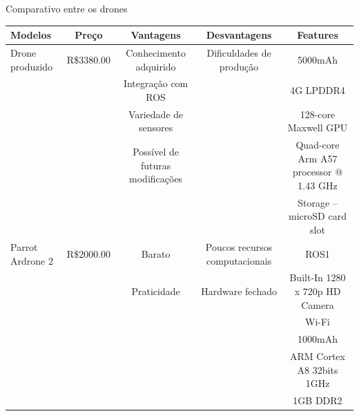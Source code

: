 \begin{frame}[t]{Comparativo entre os drones}
  \transdissolve[duration=0.5]

  \centering
  \resizebox{\textwidth}{!} {
    \begin{tabular}{ l c c c c}
      \textbf{Modelos} & \textbf{Preço} & \textbf{Vantagens}               & \textbf{Desvantagens}          & \textbf{Features}                      \\ \hline
      Drone produzido  & R\$3380.00     & Conhecimento adquirido           & Dificuldades de produção       & 5000mAh                                \\
                       &                & Integração com ROS               &                                & 4G LPDDR4                              \\
                       &                & Variedade de sensores            &                                & 128-core Maxwell GPU                   \\
                       &                & Possível de futuras modificações &                                & Quad-core Arm A57 processor @ 1.43 GHz \\
                       &                &                                  &                                & Storage – microSD card slot            \\ \hline
      Parrot Ardrone 2 & R\$2000.00     & Barato                           & Poucos recursos computacionais & ROS1                                   \\
                       &                & Praticidade                      & Hardware fechado               & Built-In 1280 x 720p HD Camera         \\
                       &                &                                  &                                & Wi-Fi                                  \\
                       &                &                                  &                                & 1000mAh                                \\
                       &                &                                  &                                & ARM Cortex A8 32bits 1GHz              \\
                       &                &                                  &                                & 1GB DDR2
    \end{tabular}
  }

\end{frame}